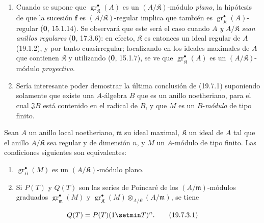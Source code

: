 \begin{remarks}[19.7.2]
\label{IV.19.7.2}
\begin{enumerate}
  \item[(i)] Cuando se supone que $\operatorname{gr}_{\mathfrak K}^\bullet(A)$ es un $(A/\mathfrak K)$-módulo \emph{plano}, la hipótesis de que la sucesión $\mathbf f$ es $(A/\mathfrak K)$-regular implica que también es $\operatorname{gr}_{\mathfrak K}^\bullet(A)$-regular (\textbf{0}, 15.1.14). Se observará que este será el caso cuando $A$ \emph{y} $A/\mathfrak K$ \emph{sean anillos regulares} (\textbf{0}, 17.3.6): en efecto, $\mathfrak K$ es entonces un ideal regular de $A$ (19.1.2), y por tanto cuasirregular; localizando en los ideales maximales de $A$ que contienen $\mathfrak K$ y utilizando (\textbf{0}, 15.1.7), se ve que $\operatorname{gr}_{\mathfrak K}^\bullet(A)$ es un $(A/\mathfrak K)$-módulo \emph{proyectivo}.
  \item[(ii)] Sería interesante poder demostrar la última conclusión de (19.7.1) suponiendo solamente que existe una $A$-álgebra $B$ que es un anillo noetheriano, para el cual $\mathfrak JB$ está contenido en el radical de $B$, y que $M$ es un $B$-\emph{módulo} de tipo finito.
\end{enumerate}
\end{remarks}

\begin{corollary}[19.7.3]
\label{IV.19.7.3}
Sean $A$ un anillo local noetheriano, $\mathfrak m$ su ideal maximal, $\mathfrak K$ un ideal de $A$ tal que el anillo $A/\mathfrak K$ sea regular y de dimensión $n$, y $M$ un $A$-módulo de tipo finito. Las condiciones siguientes son equivalentes:
\begin{enumerate}
  \item[\textup{a)}] $\operatorname{gr}_{\mathfrak K}^\bullet(M)$ es un $(A/\mathfrak K)$-módulo plano.
  \item[\textup{b)}] Si $P(T)$ y $Q(T)$ son las series de Poincaré de los $(A/\mathfrak m)$-módulos graduados $\operatorname{gr}_{\mathfrak m}^\bullet(M)$ y $\operatorname{gr}_{\mathfrak K}^\bullet(M)\otimes_{A/\mathfrak K}(A/\mathfrak m)$, se tiene
\end{enumerate}
\begin{equation}
  Q(T)=P(T)(1\setmin T)^n.
  \tag{19.7.3.1}\label{IV.19.7.3.1}
\end{equation}
\end{corollary}

